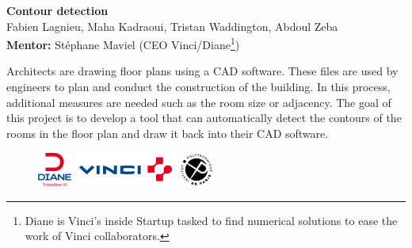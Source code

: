\documentclass[11pt]{article}
\begin{document}
\begin{center}
\textbf{Contour detection} \\
Fabien Lagnieu, Maha Kadraoui, Tristan Waddington, Abdoul Zeba\\
\textbf{Mentor:} Stéphane Maviel (CEO Vinci/Diane\footnote{Diane is Vinci's inside Startup tasked to find numerical solutions
to ease the work of Vinci collaborators.}) \\\vspace{2em}
\textbf{\Large }
\end{center}
\vspace{-1cm}

Architects are drawing floor plans using a CAD software. These files are used
by engineers to plan and conduct the construction of the building. In this process,
additional measures are needed such as the room size or adjacency. The goal of 
this project is to develop a tool that can automatically detect the contours of 
the rooms in the floor plan and draw it back into their CAD software. 

\begin{figure}[h]
    \centering
    \includegraphics[width=0.1\textwidth]{figures/Diane.png}
    \hspace{0.1\textwidth}
    \includegraphics[width=0.3\textwidth]{figures/logo_vinci.png}
    \hspace{0.1\textwidth}
    \includegraphics[width=0.1\textwidth]{figures/ipparis.png}

    \label{fig:my_label}
\end{figure}
\end{document}
